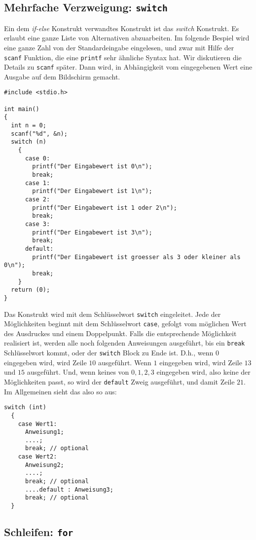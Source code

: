 \subsection{Mehrfache Verzweigung: \texttt{switch}}

Ein dem \emph{if-else} Konstrukt verwandtes Konstrukt ist das \emph{switch} Konstrukt.
Es erlaubt eine ganze Liste von Alternativen abzuarbeiten.
Im folgende Bespiel wird eine ganze Zahl von der Standardeingabe eingelesen, und zwar mit Hilfe der \verb|scanf| Funktion, die eine \verb|printf| sehr ähnliche Syntax hat.
Wir diskutieren die Details zu \verb|scanf| später.
Dann wird, in Abhängigkeit vom eingegebenen Wert eine Ausgabe auf dem Bildschirm gemacht.
\begin{lstlisting}
#include <stdio.h>

int main()
{
  int n = 0;
  scanf("%d", &n);
  switch (n)
    {
      case 0:
        printf("Der Eingabewert ist 0\n");
        break;
      case 1:
        printf("Der Eingabewert ist 1\n");
      case 2:
        printf("Der Eingabewert ist 1 oder 2\n");
        break;
      case 3:
        printf("Der Eingabewert ist 3\n");
        break;
      default:
        printf("Der Eingabewert ist groesser als 3 oder kleiner als 0\n");
        break;
    }
  return (0);
}
\end{lstlisting}
Das Konstrukt wird mit dem Schlüsselwort \verb|switch| eingeleitet.
Jede der Möglichkeiten beginnt mit dem Schlüsselwort \verb|case|, gefolgt vom möglichen Wert des Ausdruckes und einem Doppelpunkt. 
Falls die entsprechende Möglichkeit realisiert ist, werden alle noch folgenden Anweisungen ausgeführt, bis ein \verb|break| Schlüsselwort kommt, oder der \verb|switch| Block zu Ende ist.
D.h., wenn $0$ eingegeben wird, wird Zeile $10$ ausgeführt.
Wenn $1$ eingegeben wird, wird Zeile $13$ und $15$ ausgeführt.
Und, wenn keines von $0,1,2,3$ eingegeben wird, also keine der Möglichkeiten passt, so wird der \verb|default| Zweig ausgeführt, und damit Zeile $21$.
Im Allgemeinen sieht das also so aus:
\begin{lstlisting}
switch (int)
  {
    case Wert1:
      Anweisung1;
      ....;
      break; // optional
    case Wert2:
      Anweisung2;
      ....;
      break; // optional
      ....default : Anweisung3;
      break; // optional
  }
\end{lstlisting}

\subsection{Schleifen: \texttt{for}}

